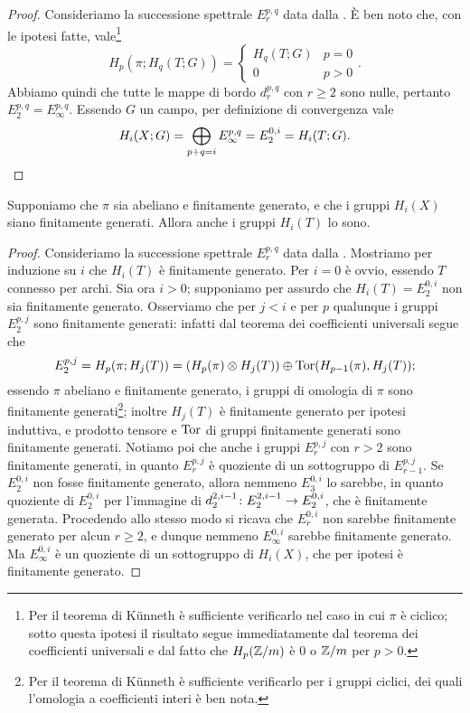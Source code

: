 \begin{proof}
Consideriamo la successione spettrale $E^{p,q}_r$ data dalla . È ben noto che, con le ipotesi fatte, vale\footnote{Per il teorema di Künneth è sufficiente verificarlo nel caso in cui $\pi$ è ciclico; sotto questa ipotesi il risultato segue immediatamente dal teorema dei coefficienti universali e dal fatto che $H_p(\mathbb{Z}/m)$ è $0$ o $\mathbb{Z}/m$ per $p>0$.}
$$
H_p(\pi;H_q(T;G))=
\begin{cases}
H_q(T;G)&p=0\\
0&p>0
\end{cases}.
$$
Abbiamo quindi che tutte le mappe di bordo $d^{p,q}_r$ con $r\ge 2$ sono nulle, pertanto $E^{p,q}_2=E^{p,q}_\infty$. Essendo $G$ un campo, per definizione di convergenza vale
$$
H_i(X;G)=\bigoplus_{p+q=i}E^{p,q}_\infty=E^{0,i}_2=H_i(T;G).
$$
\end{proof}

\begin{proposition}
Supponiamo che $\pi$ sia abeliano e finitamente generato, e che i gruppi $H_i(X)$ siano finitamente generati. Allora anche i gruppi $H_i(T)$ lo sono.
\end{proposition}
\begin{proof}
Consideriamo la successione spettrale $E^{p,q}_r$ data dalla . Mostriamo per induzione su $i$ che $H_i(T)$ è finitamente generato. Per $i=0$ è ovvio, essendo $T$ connesso per archi. Sia ora $i>0$; supponiamo per assurdo che $H_i(T)=E^{0,i}_2$ non sia finitamente generato. Osserviamo che per $j<i$ e per $p$ qualunque i gruppi $E^{p,j}_2$ sono finitamente generati: infatti dal teorema dei coefficienti universali segue che
$$
E^{p,j}_2=H_p(\pi;H_j(T))=(H_p(\pi)\mathbin{\otimes} H_j(T))\mathbin{\oplus}\operatorname{Tor}(H_{p-1}(\pi),H_j(T));
$$
essendo $\pi$ abeliano e finitamente generato, i gruppi di omologia di $\pi$ sono finitamente generati\footnote{Per il teorema di Künneth è sufficiente verificarlo per i gruppi ciclici, dei quali l'omologia a coefficienti interi è ben nota.}; inoltre $H_j(T)$ è finitamente generato per ipotesi induttiva, e prodotto tensore e $\operatorname{Tor}$ di gruppi finitamente generati sono finitamente generati. Notiamo poi che anche i gruppi $E^{p,j}_r$ con $r>2$ sono finitamente generati, in quanto $E^{p,j}_r$ è quoziente di un sottogruppo di $E^{p,j}_{r-1}$. Se $E^{0,i}_2$ non fosse finitamente generato, allora nemmeno $E^{0,i}_3$ lo sarebbe, in quanto quoziente di $E^{0,i}_2$ per l'immagine di $d^{2,i-1}_2\colon E^{2,i-1}_2\to E^{0,i}_2$, che è finitamente generata. Procedendo allo stesso modo si ricava che $E^{0,i}_r$ non sarebbe finitamente generato per alcun $r\ge 2$, e dunque nemmeno $E^{0,i}_\infty$ sarebbe finitamente generato. Ma $E^{0,i}_\infty$ è un quoziente di un sottogruppo di $H_i(X)$, che per ipotesi è finitamente generato.
\end{proof}